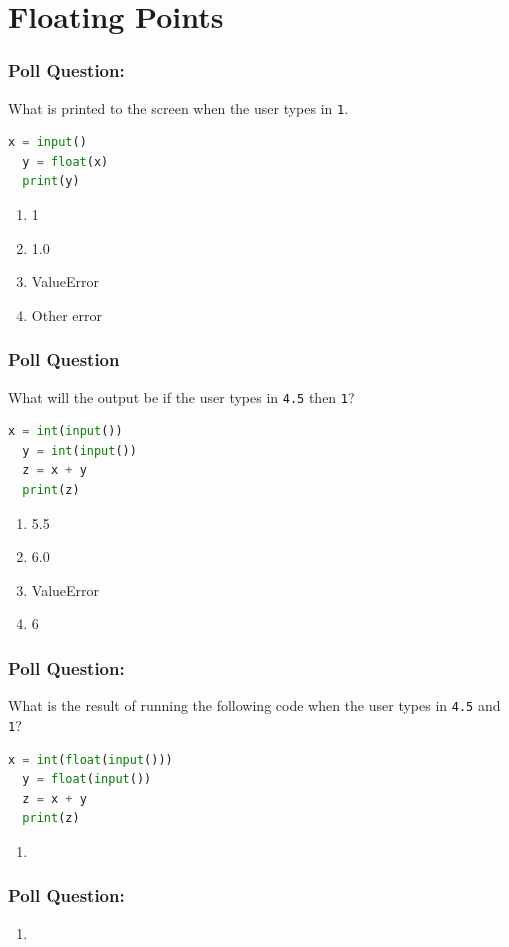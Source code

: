 \documentclass{beamer}
\begin{document}
\section{Floating Points}
%
%
%
\begin{frame}[fragile]
  \frametitle{Poll Question: }
  What is printed to the screen when the user types in \lstinline|1|.
  \begin{lstlisting}[language=Python]
  x = input()
  y = float(x)
  print(y)
  \end{lstlisting}
  \vfill
  \begin{enumerate}[A]
    \item 1
    \item 1.0
    \item ValueError
    \item Other error
  \end{enumerate}
\end{frame}


%
%
%
\begin{frame}[fragile]
  \frametitle{Poll Question}
  What will the output be if the user types in \lstinline|4.5| then \lstinline|1|?
  \begin{lstlisting}[language=Python]
  x = int(input())
  y = int(input())
  z = x + y
  print(z)
  \end{lstlisting}
  \vfill
  \begin{enumerate}
    \item 5.5
    \item 6.0
    \item ValueError
    \item 6
  \end{enumerate}
\end{frame}

%
%
%
\begin{frame}[fragile]
  \frametitle{Poll Question: }
  What is the result of running the following code when the user types in \lstinline|4.5| and \lstinline|1|?
  \begin{lstlisting}[language=Python]
  x = int(float(input()))
  y = float(input())
  z = x + y
  print(z)
  \end{lstlisting}
  \vfill
  \begin{enumerate}
    \item
  \end{enumerate}
\end{frame}

%
%
%
\begin{frame}[fragile]
  \frametitle{Poll Question: }

  \vfill
  \begin{enumerate}
    \item
  \end{enumerate}
\end{frame}
\end{document}
